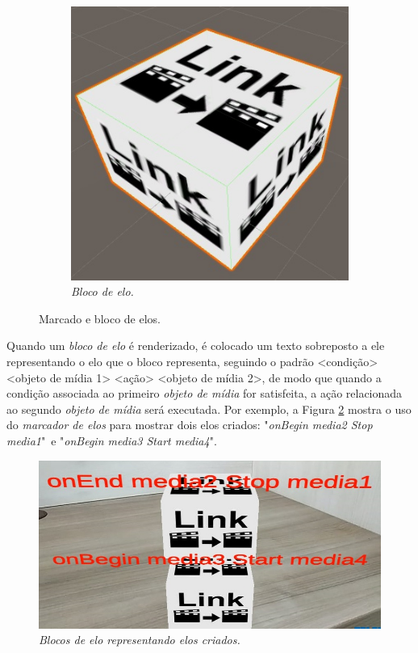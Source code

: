\documentclass[../main.tex]{subfiles}
\begin{document}
\begin{figure}[!h]
\begin{subfigure}{0.3\linewidth}
    \includegraphics[width=1\linewidth]{IMG/Blocos/eloblock.jpg}
    \caption{\textit{Bloco de elo.}}
  \end{subfigure}
\caption{Marcado e bloco de elos.}
\label{fig:elo}
\end{figure}


Quando um \emph{bloco de elo} é renderizado, é colocado um texto sobreposto a ele representando o elo que o bloco representa, seguindo o padrão <condição> <objeto de mídia 1> <ação> <objeto de mídia 2>, de modo que quando a condição associada ao primeiro \emph{objeto de mídia} for satisfeita, a ação relacionada ao segundo \emph{objeto de mídia} será executada. Por exemplo, a Figura \ref{fig:elos} mostra o uso do \emph{marcador de elos} para mostrar dois elos criados: "\emph{onBegin media2 Stop media1}"~e "\emph{onBegin media3 Start media4}".

\begin{figure}[!ht]
\centering
\includegraphics[width=0.6\linewidth]{IMG/Blocos/linksblock.jpg}
\caption{\textit{\emph{Blocos de elo} representando elos criados.}}
\label{fig:elos}
\end{figure}
\end{document}
